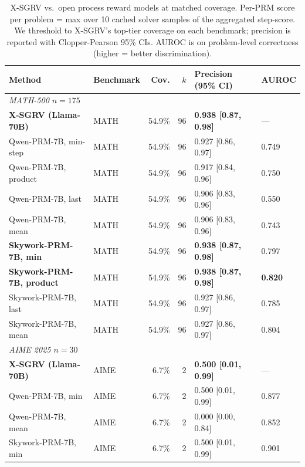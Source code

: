 \documentclass{article}
\begin{document}
\begin{table}[t]
\centering
\caption{X-SGRV vs.\ open process reward models at matched coverage. Per-PRM score per problem = max over 10 cached solver samples of the aggregated step-score. We threshold to X-SGRV's top-tier coverage on each benchmark; precision is reported with Clopper-Pearson 95\% CIs. AUROC is on problem-level correctness (higher = better discrimination).}
\label{tab:prm}
\footnotesize
\begin{tabular}{llrrll}
\toprule
Method & Benchmark & Cov. & $k$ & Precision (95\% CI) & AUROC \\
\midrule
\multicolumn{6}{l}{\emph{MATH-500 $n{=}175$}}\\
\textbf{X-SGRV (Llama-70B)}                & MATH & 54.9\% & 96 & \textbf{0.938 [0.87, 0.98]} & --- \\
Qwen-PRM-7B, min-step                       & MATH & 54.9\% & 96 & 0.927 [0.86, 0.97] & 0.749 \\
Qwen-PRM-7B, product                        & MATH & 54.9\% & 96 & 0.917 [0.84, 0.96] & 0.750 \\
Qwen-PRM-7B, last                           & MATH & 54.9\% & 96 & 0.906 [0.83, 0.96] & 0.550 \\
Qwen-PRM-7B, mean                           & MATH & 54.9\% & 96 & 0.906 [0.83, 0.96] & 0.743 \\
\textbf{Skywork-PRM-7B, min}                & MATH & 54.9\% & 96 & \textbf{0.938 [0.87, 0.98]} & 0.797 \\
\textbf{Skywork-PRM-7B, product}            & MATH & 54.9\% & 96 & \textbf{0.938 [0.87, 0.98]} & \textbf{0.820} \\
Skywork-PRM-7B, last                        & MATH & 54.9\% & 96 & 0.927 [0.86, 0.97] & 0.785 \\
Skywork-PRM-7B, mean                        & MATH & 54.9\% & 96 & 0.927 [0.86, 0.97] & 0.804 \\
\midrule
\multicolumn{6}{l}{\emph{AIME 2025 $n{=}30$}}\\
\textbf{X-SGRV (Llama-70B)}                & AIME &  6.7\% &  2 & \textbf{0.500 [0.01, 0.99]} & --- \\
Qwen-PRM-7B, min                            & AIME &  6.7\% &  2 & 0.500 [0.01, 0.99] & 0.877 \\
Qwen-PRM-7B, mean                           & AIME &  6.7\% &  2 & 0.000 [0.00, 0.84] & 0.852 \\
Skywork-PRM-7B, min                         & AIME &  6.7\% &  2 & 0.500 [0.01, 0.99] & 0.901 \\

\end{tabular}
\end{table}
\end{document}
